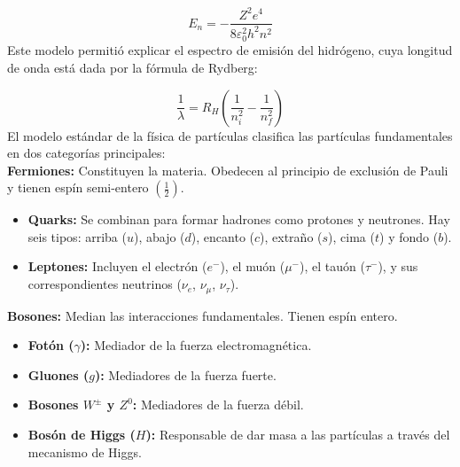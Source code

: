 \[
E_n = -\frac{Z^2 e^4}{8 \varepsilon_0^2 h^2 n^2}
\]
\noindent 
Este modelo permitió explicar el espectro de emisión del hidrógeno, cuya longitud de onda está dada por la fórmula de Rydberg:

\[
\frac{1}{\lambda} = R_H \left( \frac{1}{n_i^2} - \frac{1}{n_f^2} \right)
\]
\noindent
El modelo estándar de la física de partículas clasifica las partículas fundamentales en dos categorías principales:\\[0.5em]
\noindent
\textbf{Fermiones:} Constituyen la materia. Obedecen al principio de exclusión de Pauli y tienen espín semi-entero $(\frac{1}{2})$.
    \begin{itemize}
        \item \textbf{Quarks:} Se combinan para formar hadrones como protones y neutrones. Hay seis tipos: arriba ($u$), abajo ($d$), encanto ($c$), extraño ($s$), cima ($t$) y fondo ($b$).
        \item \textbf{Leptones:} Incluyen el electrón ($e^-$), el muón ($\mu^-$), el tauón ($\tau^-$), y sus correspondientes neutrinos ($\nu_e$, $\nu_\mu$, $\nu_\tau$).
    \end{itemize}
\noindent
\textbf{Bosones:} Median las interacciones fundamentales. Tienen espín entero.
    \begin{itemize}
        \item \textbf{Fotón ($\gamma$):} Mediador de la fuerza electromagnética.
        \item \textbf{Gluones ($g$):} Mediadores de la fuerza fuerte.
        \item \textbf{Bosones $W^\pm$ y $Z^0$:} Mediadores de la fuerza débil.
        \item \textbf{Bosón de Higgs ($H$):} Responsable de dar masa a las partículas a través del mecanismo de Higgs.
    \end{itemize}


